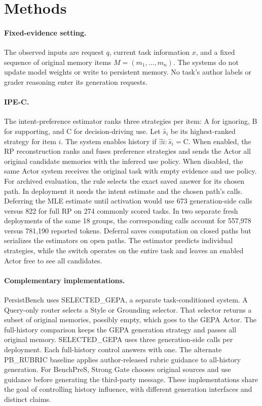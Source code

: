 \documentclass[11pt]{article}
\begin{document}
\section{Methods}

\paragraph{Fixed-evidence setting.}
The observed inputs are request $q$, current task information $x$, and a fixed sequence of original memory items $M=(m_1,\dots,m_n)$. The systems do not update model weights or write to persistent memory. No task's author labels or grader reasoning enter its generation requests.

\paragraph{IPE-C.}
The intent-preference estimator ranks three strategies per item: A for ignoring, B for supporting, and C for decision-driving use. Let $\widehat{s}_i$ be its highest-ranked strategy for item $i$. The system enables history if $\exists i:\widehat{s}_i=\mathrm{C}$. When enabled, the RP reconstruction ranks and fuses preference strategies and sends the Actor all original candidate memories with the inferred use policy. When disabled, the same Actor system receives the original task with empty evidence and use policy. For archived evaluation, the rule selects the exact saved answer for its chosen path. In deployment it needs the intent estimate and the chosen path's calls. Deferring the MLE estimate until activation would use 673 generation-side calls versus 822 for full RP on 274 commonly scored tasks. In two separate fresh deployments of the same 18 groups, the corresponding calls account for 557,978 versus 781,190 reported tokens. Deferral saves computation on closed paths but serializes the estimators on open paths. The estimator predicts individual strategies, while the switch operates on the entire task and leaves an enabled Actor free to see all candidates.

\paragraph{Complementary implementations.}
PersistBench uses SELECTED\_GEPA, a separate task-conditioned system. A Query-only router selects a Style or Grounding selector. That selector returns a subset of original memories, possibly empty, which goes to the GEPA Actor. The full-history comparison keeps the GEPA generation strategy and passes all original memory. SELECTED\_GEPA uses three generation-side calls per deployment. Each full-history control answers with one. The alternate PB\_RUBRIC baseline applies author-released rubric guidance to all-history generation. For BenchPreS, Strong Gate chooses original sources and use guidance before generating the third-party message. These implementations share the goal of controlling history influence, with different generation interfaces and distinct claims.
\end{document}
